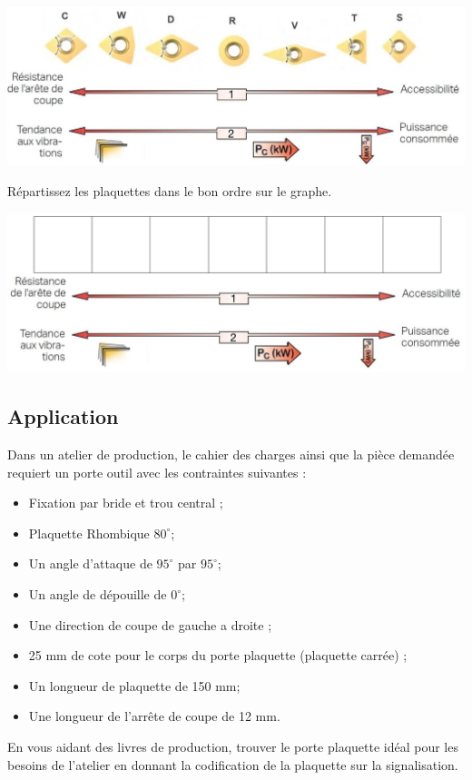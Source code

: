 \documentclass[12pt,a4paper]{article} %
\begin{document}
\begin{center}
\includegraphics[width=0.7\linewidth]{PLA22.JPG}
\end{center}

\begin{exo} Répartissez les plaquettes dans le bon ordre sur le graphe. \end{exo}
\begin{center}
\includegraphics[width=0.85\linewidth]{PLA23.JPG}
\end{center}



\subsection{Application}
\begin{tcolorbox}[colback=blue!5!white,colframe=red!75!black]
   \bcdodecaedre Dans un atelier de production, le cahier des charges ainsi que la pièce demandée requiert un porte outil avec les contraintes suivantes :

\begin{itemize}
\item Fixation par bride et trou central ;
\item Plaquette Rhombique $80^{\circ}$;
\item Un angle d'attaque de $95^{\circ}$ par $95^{\circ}$;
\item Un angle de dépouille de $0^{\circ}$;
\item Une direction de coupe de gauche a droite ;
\item 25 mm de cote pour le corps du porte plaquette (plaquette carrée) ;
\item Un longueur de plaquette de 150 mm;
\item Une longueur de l'arrête de coupe de 12 mm.
\end{itemize}
  
\end{tcolorbox}
\begin{exo} En vous aidant des livres de production, trouver le porte plaquette idéal pour les besoins de l'atelier en donnant la codification de la plaquette sur la signalisation. \end{exo}
\end{document}

